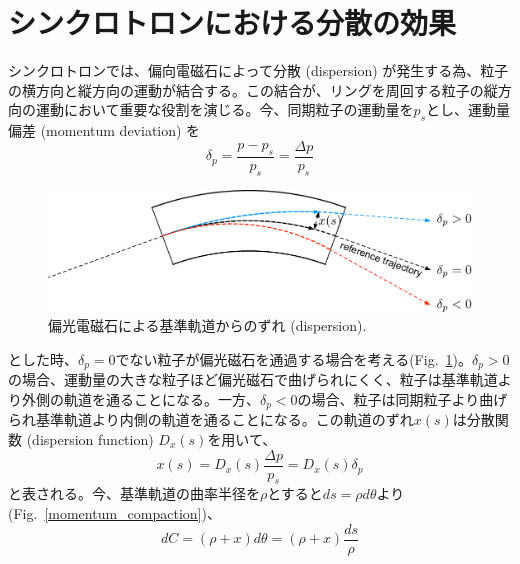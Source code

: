 \documentclass[10pt,a4paper]{ltjsarticle}
\begin{document}
\section{シンクロトロンにおける分散の効果}
シンクロトロンでは、偏向電磁石によって分散 (dispersion) が発生する為、粒子の横方向と縦方向の運動が結合する。この結合が、リングを周回する粒子の縦方向の運動において重要な役割を演じる。今、同期粒子の運動量を$p_s$とし、運動量偏差 (momentum deviation) を
%
\begin{equation}
  \delta_p = \frac{p-p_s}{p_s}=\frac{\Delta p}{p_s}
\end{equation}
%
\begin{figure}[hbt]
  \begin{center}
    \includegraphics[width=15cm,clip]{dispersion.pdf}
    \caption{偏光電磁石による基準軌道からのずれ (dispersion).}
    \label{dispersion}
  \end{center}
\end{figure}
%
とした時、$\delta_p = 0$でない粒子が偏光磁石を通過する場合を考える(Fig.~\ref{dispersion})。$\delta_p >0$ の場合、運動量の大きな粒子ほど偏光磁石で曲げられにくく、粒子は基準軌道より外側の軌道を通ることになる。一方、$\delta_p<0$の場合、粒子は同期粒子より曲げられ基準軌道より内側の軌道を通ることになる。この軌道のずれ$x(s)$は分散関数 (dispersion function) $D_x(s)$を用いて、
%
\begin{equation}
  x(s) = D_x(s)\frac{\Delta p}{p_s} = D_x(s)\delta_p 
\end{equation}
%
と表される。今、基準軌道の曲率半径を$\rho$とすると$ds = \rho d\theta$より (Fig.~\ref{momentum_compaction})、
%
\begin{equation}
  dC = (\rho + x) d\theta = (\rho + x) \frac{ds}{\rho}
\end{equation}
%
\end{document}
